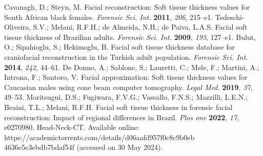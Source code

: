 \documentclass[journal,article,submit,pdftex,moreauthors]{Definitions/mdpi}
\begin{document}
\begin{thebibliography}{999}
Cavanagh, D.; Steyn, M. Facial reconstruction: Soft tissue thickness values for South African black females. {\em Forensic Sci. Int.} {\bf 2011}, {\em 206}, 215--e1.
Tedeschi-Oliveira, S.V.; Melani, R.F.H.; de Almeida, N.H.; de Paiva, L.A.S. Facial soft tissue thickness of Brazilian adults. {\em Forensic Sci. Int.} {\bf 2009}, {\em 193}, 127--e1.
Bulut, O.; Sipahioglu, S.; Hekimoglu, B. Facial soft tissue thickness database for craniofacial reconstruction in the Turkish adult population. {\em Forensic Sci. Int.} {\bf 2014}, {\em 242}, 44--61.
De Donno, A.; Sablone, S.; Lauretti, C.; Mele, F.; Martini, A.; Introna, F.; Santoro, V. Facial approximation: Soft tissue thickness values for Caucasian males using cone beam computer tomography. {\em Legal Med.} {\bf 2019}, {\em 37}, 49--53.
Moritsugui, D.S.; Fugiwara, F.V.G.; Vassallo, F.N.S.; Mazzilli, L.E.N.; Beaini, T.L.; Melani, R.F.H. Facial soft tissue thickness in forensic facial reconstruction: Impact of regional differences in Brazil. {\em Plos one} {\bf 2022}, {\em 17}, e0270980.
Head-Neck-CT. Available online: https://academictorrents.com/details/d06aafd957f0c8c9b0eb 4636e5c3ebdb7bdaf54f (accessed on 30 May 2024).
\end{thebibliography}
\end{document}
